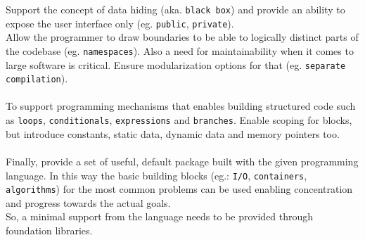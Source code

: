 \documentclass{article}
\begin{document}
\begin{itemize}
    Support the concept of data hiding (aka. \texttt{black box}) and provide an ability to expose the user interface only (eg. \texttt{public}, \texttt{private}).
    \\
    Allow the programmer to draw boundaries to be able to logically distinct parts of the codebase (eg. \texttt{namespaces}).
    Also a need for maintainability when it comes to large software is critical. Ensure modularization options for that (eg. \texttt{separate compilation}).
  \\
  \\
  \-To support programming mechanisms that enables building structured code such as \texttt{loops}, \texttt{conditionals}, \texttt{expressions}
  and \texttt{branches}. Enable scoping for blocks, but introduce constants, static data, dynamic data and memory pointers too.
  \\
  \\
  \-Finally, provide a set of useful, default package built with the given programming language.
  In this way the basic building blocks (eg.: \texttt{I/O}, \texttt{containers}, \texttt{algorithms})
  for the most common problems can be used enabling concentration and progress towards the actual goals.
  \\
  So, a minimal support from the language needs to be provided through foundation libraries.
  

\end{itemize}
\end{document}
